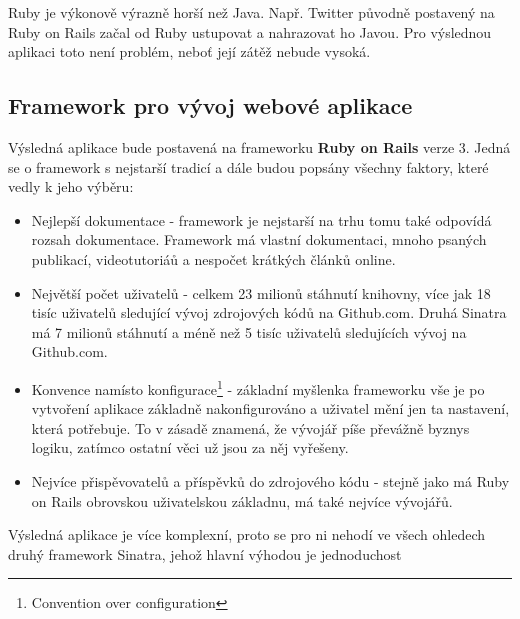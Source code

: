 Ruby je výkonově výrazně horší než Java\cite{website:java-ruby-performance}. Např. Twitter původně postavený na Ruby on Rails začal od Ruby ustupovat a nahrazovat ho Javou\cite{website:twitter-ruby-java}. Pro výslednou aplikaci toto není problém, neboť její zátěž nebude vysoká.

\subsection{Framework pro vývoj webové aplikace}
Výsledná aplikace bude postavená na frameworku \textbf{Ruby on Rails} verze 3. Jedná se o framework s nejstarší tradicí a dále budou popsány všechny faktory, které vedly k jeho výběru:

\begin{itemize}
\item Nejlepší dokumentace - framework je nejstarší na trhu tomu také odpovídá rozsah dokumentace. Framework má vlastní dokumentaci, mnoho psaných publikací, videotutoriáů a nespočet krátkých článků online\cite{website:ruby-toolbox-web}\cite{website:ruby-rails-documentation}.
\item Největší počet uživatelů - celkem 23 milionů stáhnutí knihovny, více jak 18 tisíc uživatelů sledující vývoj zdrojových kódů na Github.com. Druhá Sinatra má 7 milionů stáhnutí a méně než 5 tisíc uživatelů sledujících vývoj na Github.com\cite{website:ruby-toolbox-web}.
\item Konvence namísto konfigurace\footnote{Convention over configuration} - základní myšlenka frameworku vše je po vytvoření aplikace základně nakonfigurováno a uživatel mění jen ta nastavení, která potřebuje. To v zásadě znamená, že vývojář píše převážně byznys logiku, zatímco ostatní věci už jsou za něj vyřešeny.
\item Nejvíce přispěvovatelů a příspěvků do zdrojového kódu - stejně jako má Ruby on Rails obrovskou uživatelskou základnu, má také nejvíce vývojářů\cite{website:ruby-toolbox-web}.
\end{itemize}

Výsledná aplikace je více komplexní, proto se pro ni nehodí ve všech ohledech druhý framework Sinatra, jehož hlavní výhodou je jednoduchost \cite{harris2011sinatra}

